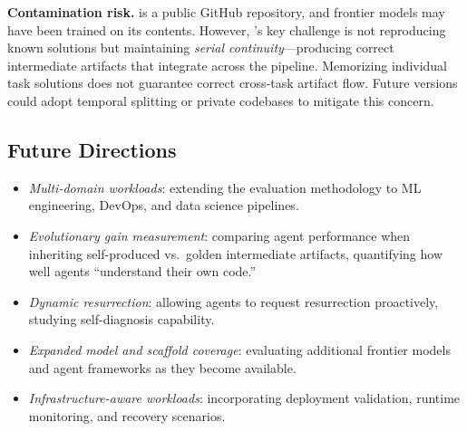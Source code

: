 \textbf{Contamination risk.}
\yatcc{} is a public GitHub repository, and frontier models may have been trained on its contents.
However, \eva{}'s key challenge is not reproducing known solutions but maintaining \emph{serial continuity}---producing correct intermediate artifacts that integrate across the pipeline.
Memorizing individual task solutions does not guarantee correct cross-task artifact flow.
Future versions could adopt temporal splitting or private codebases to mitigate this concern.

\subsection{Future Directions}

\begin{itemize}[nosep]
\item \emph{Multi-domain workloads}: extending the evaluation methodology to ML engineering, DevOps, and data science pipelines.
\item \emph{Evolutionary gain measurement}: comparing agent performance when inheriting self-produced vs.\ golden intermediate artifacts, quantifying how well agents ``understand their own code.''
\item \emph{Dynamic resurrection}: allowing agents to request resurrection proactively, studying self-diagnosis capability.
\item \emph{Expanded model and scaffold coverage}: evaluating additional frontier models and agent frameworks as they become available.
\item \emph{Infrastructure-aware workloads}: incorporating deployment validation, runtime monitoring, and recovery scenarios.
\end{itemize}
